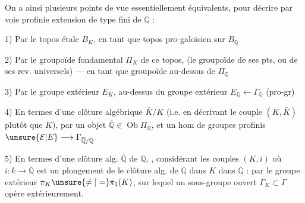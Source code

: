 On a ainsi plusieurs points de vue essentiellement équivalents, pour décrire par voie profinie  extension  de type fini de $\mathbb Q$ :

1) Par le topos étale $B_K$, en tant que topos pro-galoisien sur $B_{\mathbb Q}$

2) Par le groupoïde fondamental $\Pi_K$ de ce topos, (le groupoïde de ses pts, ou de ses rev. universels) --- en tant que groupoïde au-dessus de $\Pi_{\mathbb Q}$

 3) Par le groupe extérieur $E_K$, au-dessus du groupe extérieur $E_{\mathbb Q}\longleftarrow\Gamma_{\mathbb Q}$ (pro-gr)

4) En termes d'une clôture algébrique $\bar K/K$ (i.e. en décrivant le couple $(K,\bar K)$ plutôt que $K$), par un objet $\overline{\mathbb Q}\in\operatorname{Ob}\Pi_{\mathbb Q}$, et un hom de groupes profinis $\unsure{\mathcal E|E}\longrightarrow\Gamma_{\overline{\mathbb Q}/\mathbb Q}$.

5) En termes d'une clôture alg.  $\overline{\mathbb Q}$ de $\mathbb Q$, ,  considérant les couples $(K,i)$ où $i:k\longrightarrow\overline{\mathbb Q}$ est un plongement de le clôture alg. de $\mathbb Q$ dans $K$ dans $\overline{\mathbb Q}$ :  par le groupe extérieur $\pi_K\unsure{\neq|=}\pi_1(K)$, sur lequel un sous-groupe ouvert $\Gamma_K\subset\Gamma$ opère extérieurement.

